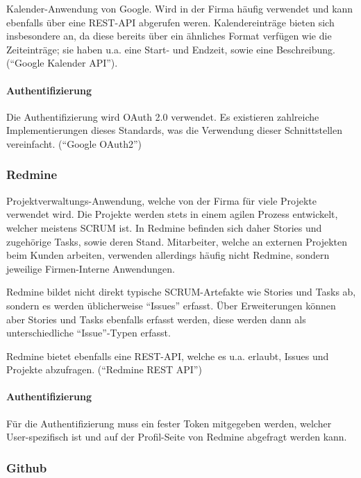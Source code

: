 \documentclass[]{article}
\begin{document}
Kalender-Anwendung von Google. Wird in der Firma häufig verwendet und
kann ebenfalls über eine REST-API abgerufen weren. Kalendereinträge
bieten sich insbesondere an, da diese bereits über ein ähnliches Format
verfügen wie die Zeiteinträge; sie haben u.a. eine Start- und Endzeit,
sowie eine Beschreibung. (``Google Kalender API'').

\paragraph{Authentifizierung}\label{authentifizierung-1}

Die Authentifizierung wird OAuth 2.0 verwendet. Es existieren zahlreiche
Implementierungen dieses Standards, was die Verwendung dieser
Schnittstellen vereinfacht. (``Google OAuth2'')

\subsubsection{Redmine}\label{redmine}

Projektverwaltungs-Anwendung, welche von der Firma für viele Projekte
verwendet wird. Die Projekte werden stets in einem agilen Prozess
entwickelt, welcher meistens SCRUM ist. In Redmine befinden sich daher
Stories und zugehörige Tasks, sowie deren Stand. Mitarbeiter, welche an
externen Projekten beim Kunden arbeiten, verwenden allerdings häufig
nicht Redmine, sondern jeweilige Firmen-Interne Anwendungen.

Redmine bildet nicht direkt typische SCRUM-Artefakte wie Stories und
Tasks ab, sondern es werden üblicherweise ``Issues'' erfasst. Über
Erweiterungen können aber Stories und Tasks ebenfalls erfasst werden,
diese werden dann als unterschiedliche ``Issue''-Typen erfasst.

Redmine bietet ebenfalls eine REST-API, welche es u.a. erlaubt, Issues
und Projekte abzufragen. (``Redmine REST API'')

\paragraph{Authentifizierung}\label{authentifizierung-2}

Für die Authentifizierung muss ein fester Token mitgegeben werden,
welcher User-spezifisch ist und auf der Profil-Seite von Redmine
abgefragt werden kann.

\subsubsection{Github}\label{github}
\end{document}
